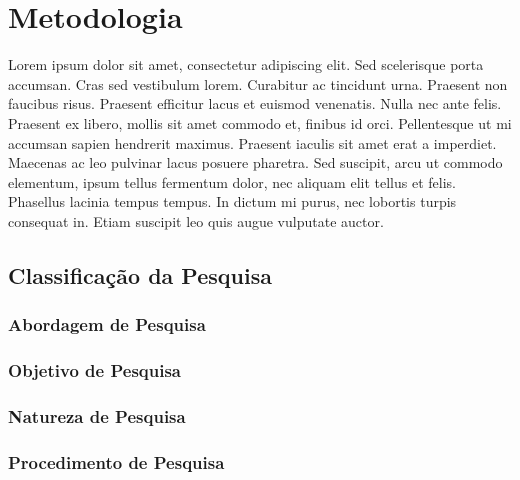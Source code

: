 \chapter{Metodologia}
\label{cap-metodologia}

Lorem ipsum dolor sit amet, consectetur adipiscing elit. Sed scelerisque porta accumsan. Cras sed vestibulum lorem. Curabitur ac tincidunt urna. Praesent non faucibus risus. Praesent efficitur lacus et euismod venenatis. Nulla nec ante felis. Praesent ex libero, mollis sit amet commodo et, finibus id orci. Pellentesque ut mi accumsan sapien hendrerit maximus. Praesent iaculis sit amet erat a imperdiet. Maecenas ac leo pulvinar lacus posuere pharetra. Sed suscipit, arcu ut commodo elementum, ipsum tellus fermentum dolor, nec aliquam elit tellus et felis. Phasellus lacinia tempus tempus. In dictum mi purus, nec lobortis turpis consequat in. Etiam suscipit leo quis augue vulputate auctor.

\section{Classificação da Pesquisa}
\label{mtd-classificacao-pesquisa}


\subsection{Abordagem de Pesquisa}
\label{mtd-abordagem-pesquisa}


\subsection{Objetivo de Pesquisa}
\label{mtd-objetivo-pesquisa}


\subsection{Natureza de Pesquisa}
\label{mtd-natureza-pesquisa}

\subsection{Procedimento de Pesquisa}
\label{mtd-procedimento-pesquisa}

